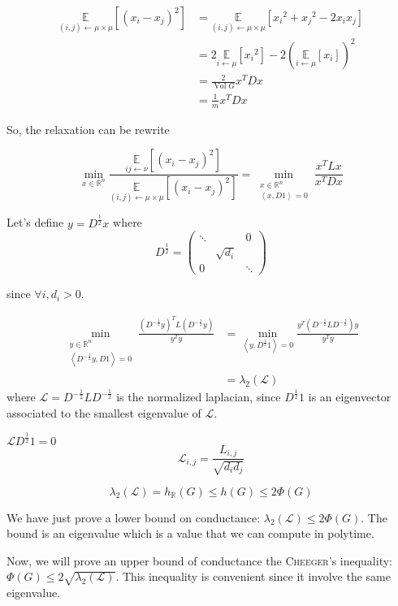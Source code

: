 \documentclass[12pt]{article}
\newcommand{\EE}{\mathbb{E}}
\newcommand{\RR}{\mathbb{R}}
\renewcommand{\L}{\mathcal{L}}
\renewcommand{\angle}[1]{\left\langle #1 \right\rangle}
\newcommand{\la}{\leftarrow}
\newcommand{\esp}[2][]{\underset{#1}{\EE}\left[ #2 \right]}
\DeclareMathOperator{\vol}{Vol}
\begin{document}
\[
    \begin{aligned}
        \esp[(i,j) \la \mu\times\mu]{(x_i-x_j)^2} &= \esp[(i,j)\la\mu\times\mu]{{x_i}^2+{x_j}^2-2x_ix_j}\\
        &= 2\esp[i\la \mu]{{x_i}^2} - 2\left( \esp[i\la \mu]{x_i}\right)^2\\
        &= \frac{2}{\vol G} x^T D x\\
        &= \frac{1}{m} x^T D x
    \end{aligned}
\]

So, the relaxation can be rewrite

\[
    \min\limits_{x\in\RR^n} \frac{\esp[ij\la\nu]{(x_i-x_j)^{2}}}{\esp[(i,j)\la\mu\times\mu]{(x_i-x_j)^2}} = \min\limits_{\substack{x\in\RR^n\\\angle{x,D1}=0}} \frac{x^TLx}{x^TDx}
\]


Let's define $y = D^{\frac{1}{2}} x$ where 
\[
    D^{\frac{1}{2}} = \left(\begin{matrix}
         \ddots&&0 \\
         & \sqrt{d_i}\\
         0&&\ddots
    \end{matrix}\right)
\]

since $\forall i, d_i >0$.

\[
    \begin{aligned}
        \min\limits_{\substack{y\in\RR^n\\\angle{D^{- \frac{1}{2}}y,D1}=0}} \frac{(D^{-\frac{1}{2}} y)^T L (D^{-\frac{1}{2}}y)}{y^Ty} &= \min\limits_{\angle{y, D^{\frac{1}{2}}1}=0} \frac{y^T(D^{-\frac{1}{2}}LD^{-\frac{1}{2}})y}{y^T y}\\
        &= \lambda_2 (\L)
    \end{aligned}
\]
where $\L = D^{-\frac{1}{2}} L D^{-\frac{1}{2}}$ is the normalized laplacian, since $D^{\frac{1}{2}}1$ is an eigenvector associated to the smallest eigenvalue of $\L$.

$\L D^{\frac{1}{2}} 1 =0$
\[
    \boxed{\L_{i,j} = \frac{L_{i,j}}{\sqrt{d_id_j}}}
\]

\[
    \lambda_2(\L) = h_\RR(G) \leqslant h(G) \leqslant 2\Phi(G)
\]

We have just prove a lower bound on conductance: $\lambda_2(\L) \leqslant 2\Phi(G)$. The bound is an eigenvalue which is a value that we can compute in polytime.

Now, we will prove an upper bound of conductance the \textsc{Cheeger}'s inequality: $\Phi(G) \leqslant 2\sqrt{\lambda_2(\L)}$. This inequality is convenient since it involve the same eigenvalue.
\end{document}
